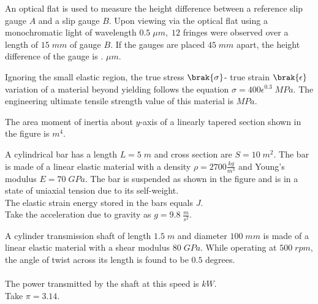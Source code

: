 
\item An optical flat is used to measure the height difference between a reference slip gauge $A$ and a slip gauge $B$. Upon viewing via the optical flat using a monochromatic light of wavelength $0.5\;\mu m,\;12$ fringes were observed over a length of $15\;mm$ of gauge $B$. If the gauges are placed $45\;mm$ apart, the height difference of the gauge is \underline{\hspace{2cm}}. $\mu m$.\\  

\item Ignoring the small elastic region, the true stress $\brak{\sigma}$- true strain $\brak{\epsilon}$ variation of a material beyond yielding follows the equation $\sigma=400\epsilon^{0.3}\;MPa$. The engineering ultimate tensile strength value of this material is \underline{\hspace{2cm}} $MPa$.\\ 
\item The area moment of inertia about $y$-axis of a linearly tapered section shown in the figure is \underline{\hspace{2cm}} $m^4$.\\ 

\item A cylindrical bar has a length $L=5\;m$ and cross section are $S=10\;m^2$. The bar is made of a linear elastic material with a density $\rho =2700\frac{kg}{m^3}$ and Young's modulus $E=70\;GPa$. The bar is suspended as shown in the figure and is in a state of uniaxial tension due to its self-weight.\\ The elastic strain energy stored in the bars equals \underline{\hspace{2cm}} $J$.\\ Take the acceleration due to gravity as $g=9.8\;\frac{m}{s^2}$.

\item A cylinder transmission shaft of length $1.5\;m$ and diameter $100\;mm$ is made of a linear elastic material with a shear modulus $80\;GPa$. While operating at $500\;rpm$, the angle of twist across its length is found to be $0.5$ degrees.\\\\ The power transmitted by the shaft at this speed is \underline{\hspace{2cm}} $kW$. \\ Take $\pi =3.14$. 
